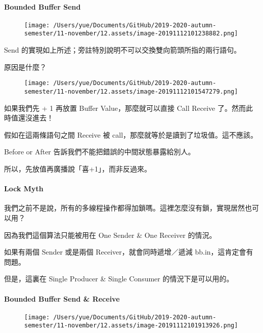 \documentclass[
]{article}
\begin{document}
\hypertarget{header-n140}{%
\paragraph{Bounded Buffer Send}\label{header-n140}}

\begin{figure}
\centering
\texttt{[image: /Users/yue/Documents/GitHub/2019-2020-autumn-semester/11-november/12.assets/image-20191112101238882.png]}
\caption{}
\end{figure}

Send 的實現如上所述；旁註特別說明不可以交換雙向箭頭所指的兩行語句。

原因是什麼？

\begin{figure}
\centering
\texttt{[image: /Users/yue/Documents/GitHub/2019-2020-autumn-semester/11-november/12.assets/image-20191112101547279.png]}
\caption{}
\end{figure}

如果我們先 + 1 再放置 Buffer Value，那麼就可以直接 Call Receive
了。然而此時值還沒進去！

假如在這兩條語句之間 Receive 被
call，那麼就等於是讀到了垃圾值。這不應該。

Before or After 告訴我們不能把錯誤的中間狀態暴露給別人。

所以，先放值再廣播說「喜+1」，而非反過來。

\hypertarget{header-n149}{%
\paragraph{Lock Myth}\label{header-n149}}

我們之前不是說，所有的多線程操作都得加鎖嗎。這裡怎麼沒有鎖，實現居然也可以用？

因為我們這個算法只能被用在 One Sender \& One Receiver 的情況。

如果有兩個 Sender 或是兩個 Receiver，就會同時遞增／遞減
bb.in，這肯定會有問題。

但是，這裏在 Single Producer \& Single Consumer 的情況下是可以用的。

\hypertarget{header-n154}{%
\paragraph{Bounded Buffer Send \& Receive}\label{header-n154}}

\begin{figure}
\centering
\texttt{[image: /Users/yue/Documents/GitHub/2019-2020-autumn-semester/11-november/12.assets/image-20191112101913926.png]}
\caption{}
\end{figure}
\end{document}

